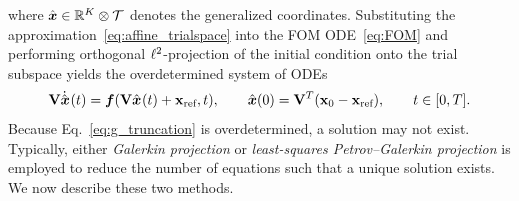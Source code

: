 \documentclass[3p,computermodern,10pt]{elsarticle}
\begin{document}
where $\hat{ \boldsymbol x} \in \mathbb{R}^{K} \otimes \mathcal{T}$ denotes the generalized
coordinates. Substituting the approximation~\eqref{eq:affine_trialspace} into the FOM ODE~\eqref{eq:FOM} and performing orthogonal
$\ell^2$-projection of the initial condition onto the trial subspace yields
the overdetermined system of ODEs
\begin{equation}\label{eq:g_truncation}
\mathbf {V} \dot{\hat{ \boldsymbol x}}^{}(t) = \boldsymbol f(\mathbf {V}
\hat{ \boldsymbol x}^{}(t) + \mathbf{x}_\text{ref},t ), \qquad \hat{ \boldsymbol x}(0) = \mathbf {V}^T( {{\mathbf{x}}_0} - \mathbf{x}_\text{ref}), \qquad t \in [0,T].
\end{equation}
Because Eq.~\eqref{eq:g_truncation} is overdetermined, a solution may not
exist. Typically, either \textit{Galerkin projection} or \textit{least-squares
Petrov--Galerkin projection} is employed to reduce the number of equations
such that a unique solution exists. We now describe these two methods.
\end{document}
